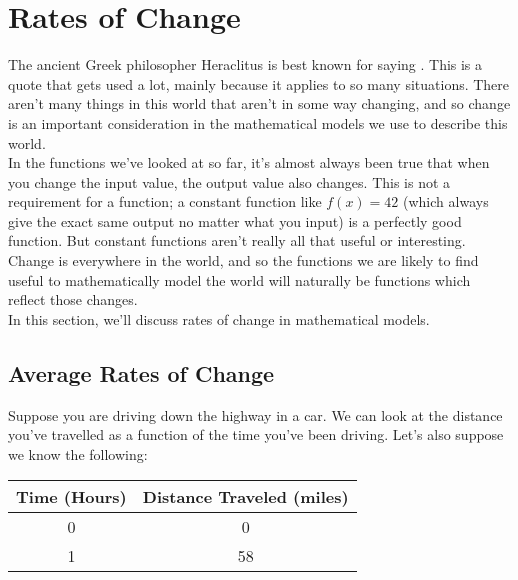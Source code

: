 %
%

\section{Rates of Change}
\label{RatesofChange}

The ancient Greek philosopher Heraclitus is best known for saying .  This is a quote that gets used a lot, mainly because it applies to so many situations. There aren’t many things in this world that aren’t in some way changing, and so change is an important consideration in the mathematical models we use to describe this world.\\

In the functions we’ve looked at so far, it’s almost always been true that when you change the input value, the output value also changes. This is not a requirement for a function; a constant function like $f(x)=42$ (which always give the exact same output no matter what you input) is a perfectly good function. But constant functions aren’t really all that useful or interesting. Change is everywhere in the world, and so the functions we are likely to find useful to mathematically model the world will naturally be functions which reflect those changes.\\

In this section, we’ll discuss rates of change in mathematical models.

%
%

\subsection{Average Rates of Change}

Suppose you are driving down the highway in a car. We can look at the distance you’ve travelled as a function of the time you’ve been driving. Let’s also suppose we know the following:

\begin{center}
	\begin{tabular}{|c|c|}
		\hline
		Time (Hours) & Distance Traveled (miles)\\
		\hline
		0 & 0 \\
		\hline
		1 & 58 \\
		\hline
	\end{tabular}
\end{center}


